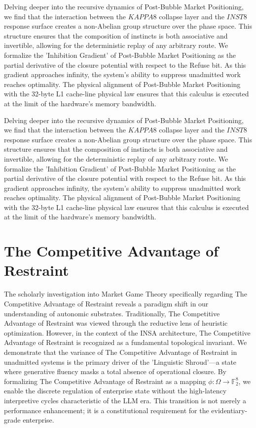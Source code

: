 \documentclass[12pt,a4paper,oneside]{book}
\begin{document}
Delving deeper into the recursive dynamics of Post-Bubble Market Positioning, we find that the interaction between the $KAPPA8$ collapse layer and the $INST8$ response surface creates a non-Abelian group structure over the phase space. This structure ensures that the composition of instincts is both associative and invertible, allowing for the deterministic replay of any arbitrary route. We formalize the 'Inhibition Gradient' of Post-Bubble Market Positioning as the partial derivative of the closure potential with respect to the Refuse bit. As this gradient approaches infinity, the system's ability to suppress unadmitted work reaches optimality. The physical alignment of Post-Bubble Market Positioning with the 32-byte L1 cache-line physical law ensures that this calculus is executed at the limit of the hardware's memory bandwidth. 

Delving deeper into the recursive dynamics of Post-Bubble Market Positioning, we find that the interaction between the $KAPPA8$ collapse layer and the $INST8$ response surface creates a non-Abelian group structure over the phase space. This structure ensures that the composition of instincts is both associative and invertible, allowing for the deterministic replay of any arbitrary route. We formalize the 'Inhibition Gradient' of Post-Bubble Market Positioning as the partial derivative of the closure potential with respect to the Refuse bit. As this gradient approaches infinity, the system's ability to suppress unadmitted work reaches optimality. The physical alignment of Post-Bubble Market Positioning with the 32-byte L1 cache-line physical law ensures that this calculus is executed at the limit of the hardware's memory bandwidth. 

\section{The Competitive Advantage of Restraint}
The scholarly investigation into Market Game Theory specifically regarding The Competitive Advantage of Restraint reveals a paradigm shift in our understanding of autonomic substrates. Traditionally, The Competitive Advantage of Restraint was viewed through the reductive lens of heuristic optimization. However, in the context of the INSA architecture, The Competitive Advantage of Restraint is recognized as a fundamental topological invariant. We demonstrate that the variance of The Competitive Advantage of Restraint in unadmitted systems is the primary driver of the 'Linguistic Shroud'---a state where generative fluency masks a total absence of operational closure. By formalizing The Competitive Advantage of Restraint as a mapping $\phi: \Omega \to \mathbb{F}_2^8$, we enable the discrete regulation of enterprise state without the high-latency interpretive cycles characteristic of the LLM era. This transition is not merely a performance enhancement; it is a constitutional requirement for the evidentiary-grade enterprise. 
\end{document}
